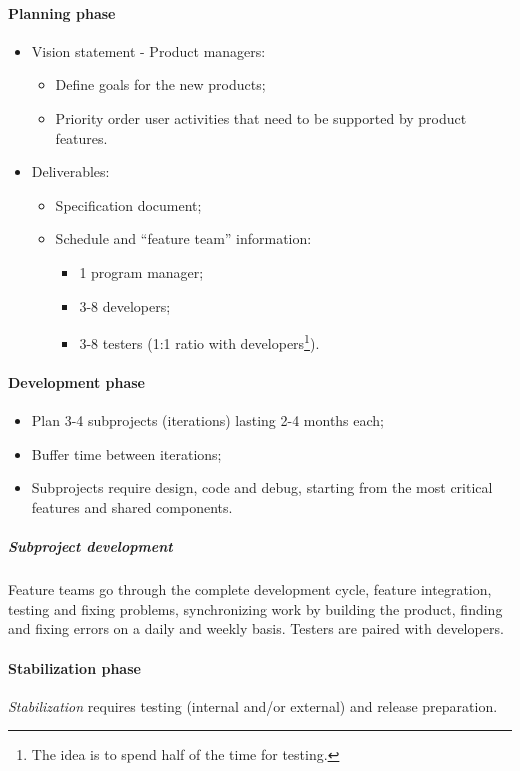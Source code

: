 \paragraph{Planning phase}
\begin{itemize}
\item Vision statement - Product managers:
\begin{itemize}
\item Define goals for the new products;
\item Priority order user activities that need to be supported by product features.
\end{itemize}
\item Deliverables:
\begin{itemize}
\item Specification document;
\item Schedule and ``feature team'' information:
\begin{itemize}
\item 1 program manager;
\item 3-8 developers;
\item 3-8 testers (1:1 ratio with developers\footnote{The idea is to spend half of the time for testing.}).
\end{itemize}
\end{itemize}
\end{itemize}

\paragraph{Development phase}
\begin{itemize}
\item Plan 3-4 subprojects (iterations) lasting 2-4 months each;
\item Buffer time between iterations;
\item Subprojects require design, code and debug, starting from the most critical features and shared components.
\end{itemize}

\subparagraph{Subproject development}
Feature teams go through the complete development cycle, feature integration, testing and fixing problems, synchronizing work by building the product, finding and fixing errors on a daily and weekly basis. Testers are paired with developers.

\paragraph{Stabilization phase}
\emph{Stabilization} requires testing (internal and/or external) and release preparation.

